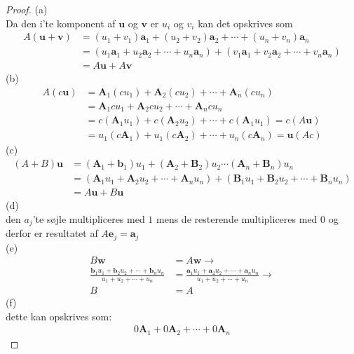 \begin{proof}
(a)\\
Da den i'te komponent af $\textbf{u}$ og $\textbf{v}$ er $u_i$ og $v_i$ kan det opskrives som
\begin{align*}
A(\mathbf{u}+\mathbf{v})&=(u_1+v_1)\mathbf{a}_1+(u_2+v_2)\mathbf{a}_2+\cdots + (u_n+v_n)\mathbf{a}_n \\
&=(u_1\mathbf{a}_1+u_2\mathbf{a}_2+\cdots+u_n\mathbf{a}_n)+(v_1\mathbf{a}_1+v_2\mathbf{a}_2+\cdots+v_n\mathbf{a}_n) \\
&=A\mathbf{u}+A\mathbf{v}
\end{align*}
(b)\\
\begin{align*}
A(c \textbf{u})&=\textbf{A}_1(cu_1)+\textbf{A}_2(cu_2) + \cdots + \textbf{A}_n(cu_n) \\
&=\textbf{A}_1cu_1+\textbf{A}_2cu_2 + \cdots + \textbf{A}_ncu_n \\
&=c(\textbf{A}_1u_1)+c(\textbf{A}_2u_2)+\cdots+c(\textbf{A}_1u_1)
=c(A \textbf{u}) \\
&= u_1(c\textbf{A}_1)+u_1(c\textbf{A}_2)+\cdots+u_n(c\textbf{A}_n)=\textbf{u}(Ac)
\end{align*}
(c)\\
\begin{align*}
(A+B)\textbf{u}&=(\textbf{A}_1+\textbf{b}_1)u_1 +(\textbf{A}_2+\textbf{B}_2)u_2 \cdots (\textbf{A}_n+\textbf{B}_n)u_n \\
&=(\textbf{A}_1u_1+\textbf{A}_2u_2+ \cdots + \textbf{A}_nu_n)+(\textbf{B}_1u_1+\textbf{B}_2u_2+ \cdots + \textbf{B}_nu_n) \\
&=A\textbf{u}+B\textbf{u}
\end{align*}
(d)\\
den $a_j$'te søjle multipliceres med $1$ mens de resterende multipliceres med $0$ og derfor er resultatet af $A\mathbf{e}_j=\mathbf{a}_j$ \\
(e)\\
\begin{align*}
B\textbf{w}&=A\textbf{w} \rightarrow\\  \frac{\textbf{b}_1u_1+\textbf{b}_2u_2+\cdots+\textbf{b}_nu_n}{u_1+u_2+\cdots+u_n} &=\frac{\textbf{a}_1u_1+\textbf{a}_2u_2+\cdots+\textbf{a}_nu_n}{u_1+u_2+\cdots+u_n} \rightarrow\\   B&=A 
\end{align*}
(f) \\
dette kan opskrives som: 
\begin{align*}
0\textbf{A}_1+0\textbf{A}_2+\cdots+0\textbf{A}_n

\end{align*}
\end{proof}
